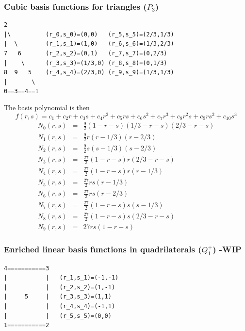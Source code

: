 \subsubsection{Cubic basis functions for triangles ($P_3$)}

\begin{verbatim}
2
|\          (r_0,s_0)=(0,0)   (r_5,s_5)=(2/3,1/3)
|  \        (r_1,s_1)=(1,0)   (r_6,s_6)=(1/3,2/3)
7   6       (r_2,s_2)=(0,1)   (r_7,s_7)=(0,2/3)
|    \      (r_3,s_3)=(1/3,0) (r_8,s_8)=(0,1/3)
8  9   5    (r_4,s_4)=(2/3,0) (r_9,s_9)=(1/3,1/3)
|       \ 
0==3==4==1
\end{verbatim}
The basis polynomial is then
\[
f(r,s) = c_1 + c_2r + c_3s + c_4 r^2 + c_5 rs + c_6 s^2 + c_7 r^3 +c_8 r^2s + c_9 rs^2 + c_{10}s^3
\]
\begin{eqnarray}
N_0(r,s) &=& \frac{9}{2}(1-r-s)(1/3-r-s)(2/3-r-s) \\
N_1(r,s) &=& \frac{9}{2}r(r-1/3)(r-2/3) \\
N_2(r,s) &=& \frac{9}{2}s(s-1/3)(s-2/3) \\
N_3(r,s) &=& \frac{27}{2}(1-r-s)r(2/3-r-s) \\
N_4(r,s) &=& \frac{27}{2}(1-r-s)r(r-1/3) \\
N_5(r,s) &=& \frac{27}{2}rs(r-1/3) \\
N_6(r,s) &=& \frac{27}{2}rs(r-2/3) \\
N_7(r,s) &=& \frac{27}{2}(1-r-s)s(s-1/3) \\
N_8(r,s) &=& \frac{27}{2}(1-r-s)s(2/3-r-s) \\
N_9(r,s) &=& 27 rs(1-r-s)
\end{eqnarray}




















\subsubsection{Enriched linear basis functions in quadrilaterals ($Q_1^+$) -WIP} \label{ss:quadmini}
\index{general}{$Q_1^+$}

\begin{verbatim}
4===========3
|           |   (r_1,s_1)=(-1,-1)
|           |   (r_2,s_2)=(1,-1)
|     5     |   (r_3,s_3)=(1,1)
|           |   (r_4,s_4)=(-1,1)
|           |   (r_5,s_5)=(0,0)
1===========2
\end{verbatim}

